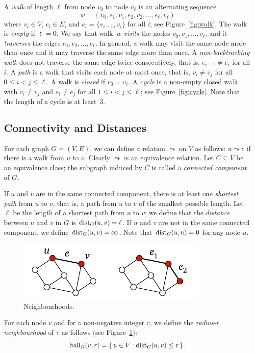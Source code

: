A \emph{walk} of length $\ell$ from node $v_0$ to node $v_\ell$ is an alternating sequence \[w = (v_0, e_1, v_1, e_2, v_2, \dotsc, e_\ell, v_\ell)\] where $v_i \in V$, $e_i \in E$, and $e_i = \{ v_{i-1}, v_i \}$ for all $i$; see Figure~\ref{fig:walk}. The walk is \emph{empty} if $\ell = 0$. We say that walk~$w$ \emph{visits} the nodes $v_0, v_1, \dotsc, v_\ell$, and it \emph{traverses} the edges $e_1, e_2, \dotsc, e_\ell$. In general, a walk may visit the same node more than once and it may traverse the same edge more than once. A \emph{non-backtracking walk} does not traverse the same edge twice consecutively, that is, $e_{i-1} \ne e_i$ for all $i$. A \emph{path} is a walk that visits each node at most once, that is, $v_i \ne v_j$ for all $0 \le i < j \le \ell$. A walk is \emph{closed} if $v_0 = v_\ell$. A \emph{cycle} is a non-empty closed walk with $v_i \ne v_j$ and $e_i \ne e_j$ for all $1 \le i < j \le \ell$; see Figure~\ref{fig:cycle}. Note that the length of a cycle is at least~$3$.


\subsection{Connectivity and Distances}\label{ssec:graphs-conn}

For each graph $G = (V,E)$, we can define a relation $\leadsto$ on $V$ as follows: $u \leadsto v$ if there is a walk from $u$ to $v$. Clearly $\leadsto$ is an equivalence relation. Let $C \subseteq V$ be an equivalence class; the subgraph induced by $C$ is called a \emph{connected component} of $G$.

If $u$ and $v$ are in the same connected component, there is at least one \emph{shortest path} from $u$ to $v$, that is, a path from $u$ to $v$ of the smallest possible length. Let $\ell$ be the length of a shortest path from $u$ to $v$; we define that the \emph{distance} between $u$ and $v$ in $G$ is $\operatorname{dist}_G(u,v) = \ell$. If $u$ and $v$ are not in the same connected component, we define $\operatorname{dist}_G(u,v) = \infty$. Note that $\operatorname{dist}_G(u,u) = 0$ for any node $u$.

\begin{figure}
    \centering
    \includegraphics[page=\PNeighbourhood]{figs.pdf}
    \caption{Neighbourhoods.}\label{fig:neighbourhood}
\end{figure}
For each node $v$ and for a non-negative integer $r$, we define the \emph{radius-$r$ neighbourhood} of $v$ as follows (see Figure~\ref{fig:neighbourhood}):
\[
    \operatorname{ball}_G(v, r) = \{\,  u \in V : \operatorname{dist}_G(u,v) \le r  \,\}.
\]

